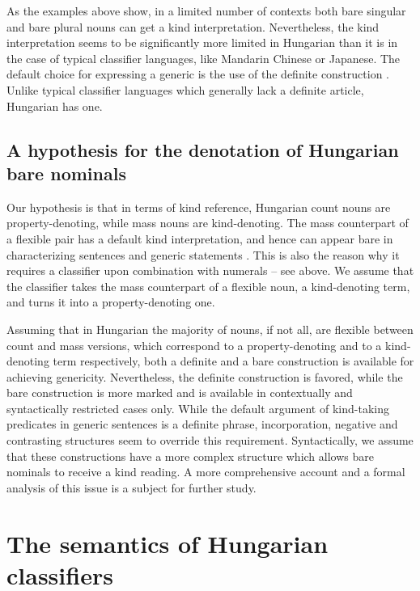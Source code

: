 \documentclass[output=paper]{langscibook}
\begin{document}
\noindent As the examples above show, in a limited number of contexts both bare singular and bare plural nouns can get a kind interpretation. Nevertheless, the kind interpretation seems to be significantly more limited in Hungarian than it is in the case of typical classifier languages, like Mandarin Chinese or Japanese. The default choice for expressing a generic is the use of the definite construction . Unlike typical classifier languages which generally lack a definite article, Hungarian has one.

\subsection{A hypothesis for the denotation of Hungarian bare nominals} \label{schv-nem:sec:4.2}

Our hypothesis is that in terms of kind reference, Hungarian count nouns are property-denoting, while mass nouns are kind-denoting. The mass counterpart of a flexible pair has a default kind interpretation, and hence can appear bare in characterizing sentences  and generic statements . This is also the reason why it requires a classifier upon combination with numerals -- see  above. We assume that the classifier takes the mass counterpart of a flexible noun, a kind-denoting term, and turns it into a property-denoting one. 

Assuming that in Hungarian the majority of nouns, if not all, are flexible between count and mass versions, which correspond to a property-denoting and to a kind-denoting term respectively, both a definite and a bare construction is available for achieving genericity. Nevertheless, the definite construction is favored, while the bare construction is more marked and is available in contextually and syntactically restricted cases only. While the default argument of kind-taking predicates in generic sentences is a definite phrase, incorporation, negative and contrasting structures seem to override this requirement. Syntactically, we assume that these constructions have a more complex structure which allows bare nominals to receive a kind reading. A more comprehensive account and a formal analysis of this issue is a subject for further study. 
   
\section{The semantics of Hungarian classifiers} \label{schv-nem:sec:5}
\end{document}
